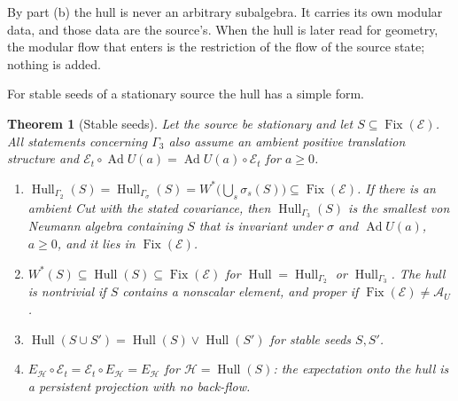 \documentclass[12pt]{article}
\newtheorem{theorem}{Theorem}[section]
\theoremstyle{definition}
\theoremstyle{remark}
\newcommand{\Fix}{\operatorname{Fix}}
\newcommand{\Hull}{\operatorname{Hull}}
\newcommand{\AU}{\mathcal A_U}
\newcommand{\Ad}{\operatorname{Ad}}
\begin{document}
By part (b) the hull is never an arbitrary subalgebra. It carries its own modular
data, and those data are the source's. When the
hull is later read for geometry, the modular flow that enters is the restriction of
the flow of the source state; nothing is added.

For stable seeds of a stationary source the hull has a simple form.

\begin{theorem}[Stable seeds]\label{thm:stableseed}
Let the source be stationary and let \(S\subseteq\Fix(\mathcal E)\).
All statements concerning \(\Gamma_3\) also assume an ambient positive translation structure and
\(\mathcal E_t\circ\Ad U(a)=\Ad U(a)\circ\mathcal E_t\) for \(a\ge0\).
\begin{enumerate}[label=(\alph*),leftmargin=2em]
\item \(\Hull_{\Gamma_2}(S)=\Hull_{\Gamma_\sigma}(S)
  =W^*\bigl(\bigcup_s\sigma_s(S)\bigr)\subseteq\Fix(\mathcal E)\). If there is an ambient
  Cut with the stated covariance, then
  \(\Hull_{\Gamma_3}(S)\) is the smallest von Neumann algebra containing \(S\) that is
  invariant under \(\sigma\) and \(\Ad U(a)\), \(a\ge0\), and it lies in
  \(\Fix(\mathcal E)\).
\item \(W^*(S)\subseteq\Hull(S)\subseteq\Fix(\mathcal E)\) for \(\Hull=\Hull_{\Gamma_2}\)
  or \(\Hull_{\Gamma_3}\). The hull is nontrivial if \(S\) contains a nonscalar
  element, and proper if \(\Fix(\mathcal E)\neq\AU\).
\item \(\Hull(S\cup S')=\Hull(S)\vee\Hull(S')\) for stable seeds \(S,S'\).
\item \(E_{\mathcal H}\circ\mathcal E_t=\mathcal E_t\circ E_{\mathcal H}=E_{\mathcal H}\)
  for \(\mathcal H=\Hull(S)\): the expectation onto the hull is a persistent projection
  with no back-flow.
\end{enumerate}
\end{theorem}
\end{document}
